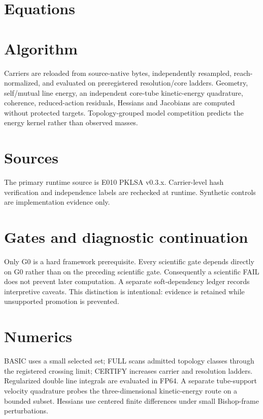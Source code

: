 \documentclass[11pt]{article}
\begin{document}
\section{Equations}


\section{Algorithm}
Carriers are reloaded from source-native bytes, independently resampled, reach-normalized, and evaluated on preregistered resolution/core ladders. Geometry, self/mutual line energy, an independent core-tube kinetic-energy quadrature, coherence, reduced-action residuals, Hessians and Jacobians are computed without protected targets. Topology-grouped model competition predicts the energy kernel rather than observed masses.

\section{Sources}
The primary runtime source is E010 PKLSA v0.3.x. Carrier-level hash verification and independence labels are rechecked at runtime. Synthetic controls are implementation evidence only.

\section{Gates and diagnostic continuation}
Only G0 is a hard framework prerequisite. Every scientific gate depends directly on G0 rather than on the preceding scientific gate. Consequently a scientific FAIL does not prevent later computation. A separate soft-dependency ledger records interpretive caveats. This distinction is intentional: evidence is retained while unsupported promotion is prevented.

\section{Numerics}
BASIC uses a small selected set; FULL scans admitted topology classes through the registered crossing limit; CERTIFY increases carrier and resolution ladders. Regularized double line integrals are evaluated in FP64. A separate tube-support velocity quadrature probes the three-dimensional kinetic-energy route on a bounded subset. Hessians use centered finite differences under small Bishop-frame perturbations.
\end{document}
